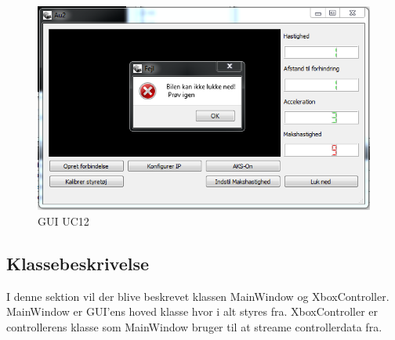\begin{figure}[H]
\centering
\includegraphics[width=\textwidth* 3/4,height=\textwidth* 9/20 ]{../fig/billeder/gui_uc12.png}
\caption{GUI UC12}
\label{fig:GUI_uc12}
\end{figure}


\subsection{Klassebeskrivelse}
I denne sektion vil der blive beskrevet klassen MainWindow og XboxController. MainWindow er GUI'ens hoved klasse hvor i alt styres fra. XboxController er controllerens klasse som MainWindow bruger til at streame controllerdata fra.

